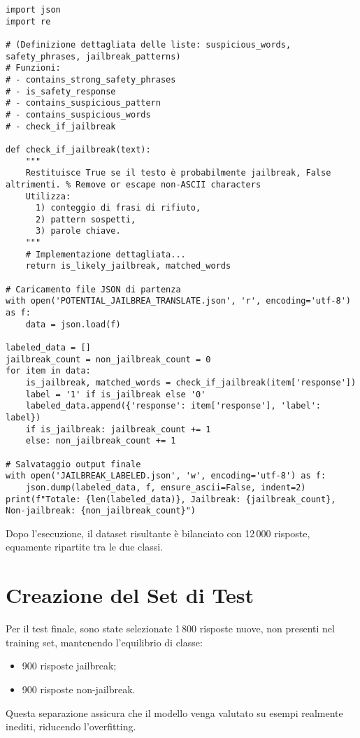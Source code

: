 \documentclass[a4paper,12pt]{article}
\begin{document}
\begin{lstlisting}[caption={Script Python per la retichettatura dettagliata}]
import json
import re

# (Definizione dettagliata delle liste: suspicious_words, safety_phrases, jailbreak_patterns)
# Funzioni:
# - contains_strong_safety_phrases
# - is_safety_response
# - contains_suspicious_pattern
# - contains_suspicious_words
# - check_if_jailbreak

def check_if_jailbreak(text):
    """
    Restituisce True se il testo è probabilmente jailbreak, False altrimenti. % Remove or escape non-ASCII characters
    Utilizza:
      1) conteggio di frasi di rifiuto,
      2) pattern sospetti,
      3) parole chiave.
    """
    # Implementazione dettagliata...
    return is_likely_jailbreak, matched_words

# Caricamento file JSON di partenza
with open('POTENTIAL_JAILBREA_TRANSLATE.json', 'r', encoding='utf-8') as f:
    data = json.load(f)

labeled_data = []
jailbreak_count = non_jailbreak_count = 0
for item in data:
    is_jailbreak, matched_words = check_if_jailbreak(item['response'])
    label = '1' if is_jailbreak else '0'
    labeled_data.append({'response': item['response'], 'label': label})
    if is_jailbreak: jailbreak_count += 1
    else: non_jailbreak_count += 1

# Salvataggio output finale
with open('JAILBREAK_LABELED.json', 'w', encoding='utf-8') as f:
    json.dump(labeled_data, f, ensure_ascii=False, indent=2)
print(f"Totale: {len(labeled_data)}, Jailbreak: {jailbreak_count}, Non-jailbreak: {non_jailbreak_count}")
\end{lstlisting}

Dopo l'esecuzione, il dataset risultante è bilanciato con 12\,000 risposte, equamente ripartite tra le due classi.

\section{Creazione del Set di Test}
Per il test finale, sono state selezionate 1\,800 risposte nuove, non presenti nel training set, mantenendo l'equilibrio di classe:
\begin{itemize}
  \item 900 risposte jailbreak;
  \item 900 risposte non-jailbreak.
\end{itemize}
Questa separazione assicura che il modello venga valutato su esempi realmente inediti, riducendo l'overfitting.
\end{document}
